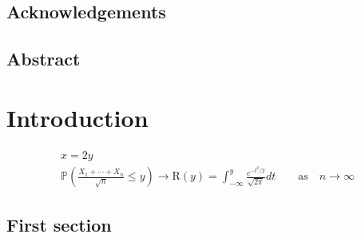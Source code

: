 \documentclass[english]{ist-thesis}
\begin{document}


\section*{Acknowledgements}

\cleardoublepage

\section*{Abstract}

\cleardoublepage

{\tableofcontents}

\cleardoublepage

\chapter{Introduction}

\begin{gather*}
	x = 2y \\
	\mathbb{P}\left(\frac{X_1 + \cdots + X_n}{\sqrt{n}} \leq y\right) \rightarrow \mathrm{R}(y) = \int_{-\infty}^{y} \frac{e^{-t^2/2}}{\sqrt{2\pi}}dt \qquad \mathrm{as} \quad n \rightarrow \infty
\end{gather*}

\section{First section}
\end{document}
